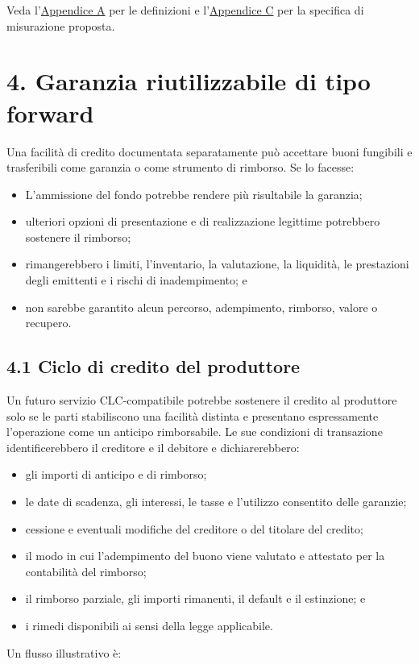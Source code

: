 \documentclass[11pt]{article}
\begin{document}
Veda l'\href{https://docs.cosmolocal.credit/it/white-paper/appendix-a-math-box}{Appendice A} per le definizioni e l'\href{https://docs.cosmolocal.credit/it/white-paper/appendix-c-kpi-definitions}{Appendice C} per la specifica di misurazione proposta.


\section*{4. Garanzia riutilizzabile di tipo forward}

Una facilità di credito documentata separatamente può accettare buoni fungibili e trasferibili come garanzia o come strumento di rimborso. Se lo facesse:

\begin{itemize}[leftmargin=*]
\item L'ammissione del fondo potrebbe rendere più risultabile la garanzia;
\item ulteriori opzioni di presentazione e di realizzazione legittime potrebbero sostenere il rimborso;
\item rimangerebbero i limiti, l'inventario, la valutazione, la liquidità, le prestazioni degli emittenti e i rischi di inadempimento; e
\item non sarebbe garantito alcun percorso, adempimento, rimborso, valore o recupero.
\end{itemize}
\subsection*{4.1 Ciclo di credito del produttore}

Un futuro servizio CLC-compatibile potrebbe sostenere il credito al produttore solo se le parti stabiliscono una facilità distinta e presentano espressamente l'operazione come un anticipo rimborsabile. Le sue condizioni di transazione identificerebbero il creditore e il debitore e dichiarerebbero:

\begin{itemize}[leftmargin=*]
\item gli importi di anticipo e di rimborso;
\item le date di scadenza, gli interessi, le tasse e l'utilizzo consentito delle garanzie;
\item cessione e eventuali modifiche del creditore o del titolare del credito;
\item il modo in cui l'adempimento del buono viene valutato e attestato per la contabilità del rimborso;
\item il rimborso parziale, gli importi rimanenti, il default e il estinzione; e
\item i rimedi disponibili ai sensi della legge applicabile.
\end{itemize}
Un flusso illustrativo è:
\end{document}
